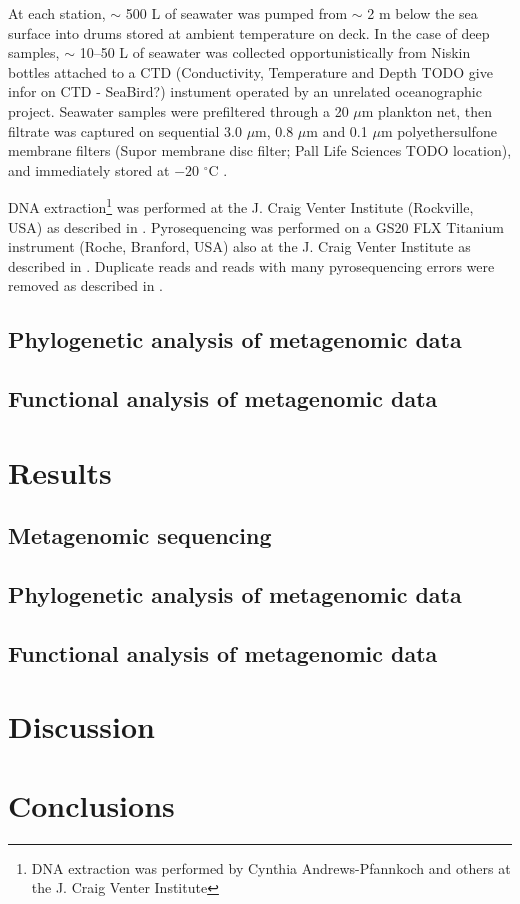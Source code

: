 At each station, $\sim$ 500 L of seawater was pumped from $\sim$ 2 m below the sea surface into drums stored at ambient temperature on deck. 
In the case of deep samples, $\sim$ 10--50 L of seawater was collected opportunistically from Niskin bottles attached to a CTD (Conductivity, Temperature and Depth TODO give infor on CTD - SeaBird?) instument operated by an unrelated oceanographic project.
Seawater samples were prefiltered through a 20 $\mu$m plankton net, then filtrate was captured on sequential 3.0 $\mu$m, 0.8 $\mu$m and 0.1 $\mu$m polyethersulfone membrane filters (Supor membrane disc filter; Pall Life Sciences TODO location), and immediately stored at $-20$ $^\circ$C \cite{Rusch:2007ez,Ng:2010cd}.

DNA extraction\footnote{DNA extraction was performed by Cynthia Andrews-Pfannkoch and others at the J. Craig Venter Institute} was performed at the J. Craig Venter Institute (Rockville, USA) as described in \citet{Rusch:2007ez}.
Pyrosequencing was performed on a GS20 FLX Titanium instrument (Roche, Branford, USA) also at the J. Craig Venter Institute as described in \citet{Lauro:2010jna}.
Duplicate reads and reads with many pyrosequencing errors were removed as described in \citet{Lauro:2010jna}.

\subsection{Phylogenetic analysis of metagenomic data}
\subsection{Functional analysis of metagenomic data}

\section{Results}
\subsection{Metagenomic sequencing}
\subsection{Phylogenetic analysis of metagenomic data}
\subsection{Functional analysis of metagenomic data}

\section{Discussion}

\section{Conclusions}

